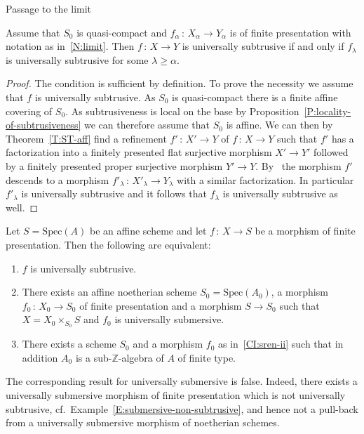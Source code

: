 \documentclass[a4paper,twoside,11pt]{amsart}[2009/07/02] %
\newcommand{\pref}[1]{\eqref{#1}}
\newcommand{\Z}{\mathbb{Z}}
\newcommand{\map}[3]{#1\,:\, #2\rightarrow #3}
\newcommand{\Spec}{\mathrm{Spec}}
\begin{document}
\begin{section}{Passage to the limit}
\begin{theorem}\label{T:subtrusive-limit-of-subtrusive}
Assume that $S_0$ is quasi-compact and $\map{f_\alpha}{X_\alpha}{Y_\alpha}$ is
of finite presentation with notation as in~\pref{N:limit}. Then $\map{f}{X}{Y}$
is universally subtrusive if and only if $f_\lambda$ is universally subtrusive
for some $\lambda\geq \alpha$.
\end{theorem}
\begin{proof}
The condition is sufficient by definition. To prove the necessity we assume
that $f$ is universally subtrusive. As $S_0$ is quasi-compact there is a finite
affine covering of $S_0$. As subtrusiveness is local on the base by
Proposition~\pref{P:locality-of-subtrusiveness} we can therefore assume that
$S_0$ is affine. We can then by Theorem~\pref{T:ST-aff} find a refinement
$\map{f'}{X'}{Y}$ of $\map{f}{X}{Y}$ such that $f'$ has a factorization into a
finitely presented flat surjective morphism $X'\to Y'$ followed by a finitely
presented proper surjective morphism $Y'\to Y$. By~\cite[Thm.~8.10.5 and
Thm.~11.2.6]{egaIV} the morphism $f'$ descends to a morphism
$\map{f'_\lambda}{X'_\lambda}{Y_\lambda}$ with a similar factorization. In
particular $f'_\lambda$ is universally subtrusive and it follows that
$f_\lambda$ is universally subtrusive as well.
\end{proof}

\begin{corollary}\label{C:subtrusive-reduction-to-exc-noeth}
Let $S=\Spec(A)$ be an affine scheme and let $\map{f}{X}{S}$ be a morphism
of finite presentation. Then the following are equivalent:
%
\begin{enumerate}
\item $f$ is universally subtrusive.
\item There exists an affine noetherian scheme $S_0=\Spec(A_0)$, a morphism
$\map{f_0}{X_0}{S_0}$ of finite presentation and a morphism $S\to S_0$ such
that $X=X_0\times_{S_0} S$ and $f_0$ is universally
submersive.\label{CI:sren-ii}
\item There exists a scheme $S_0$ and a morphism $f_0$ as in~\ref{CI:sren-ii}
such that in addition $A_0$ is a sub-$\Z$-algebra of $A$ of finite type.
\end{enumerate}
\end{corollary}

The corresponding result for universally submersive is false. Indeed, there
exists
a universally submersive morphism of finite presentation which is not
universally subtrusive, cf.\ Example~\pref{E:submersive-non-subtrusive}, and
hence not a pull-back from a universally submersive morphism of noetherian
schemes.


\end{section}
\end{document}
